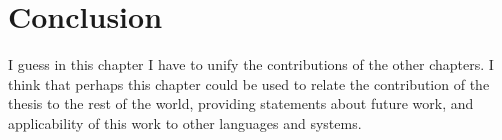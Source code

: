 \documentclass[a4paper,twoside]{report}
\begin{document}
\chapter{Conclusion}


I guess in this chapter I have to unify the contributions of the other
chapters.
I think that perhaps this chapter could be used to relate the contribution
of the thesis to the rest of the world, providing statements about future
work, and applicability of this work to other languages and systems.




\end{document}
